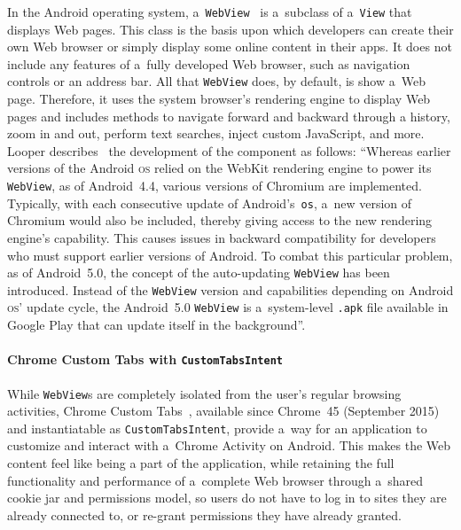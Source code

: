 \documentclass[sigconf,hyphens]{acmart}
\begin{document}
In the Android operating system, a~\texttt{WebView}~\cite{android2018webview}
is a~subclass of a~\texttt{View} that displays Web pages.
This class is the basis upon which developers can create their own Web browser
or simply display some online content in their apps.
It does not include any features of a~fully developed Web browser,
such as navigation controls or an address bar.
All that \texttt{WebView} does, by default, is show a~Web page.
Therefore, it uses the system browser's rendering engine to display Web pages
and includes methods to navigate forward and backward through a history,
zoom in and out, perform text searches, inject custom JavaScript, and more.
Looper describes~\cite{looper2015webviews}
the development of the component as follows:
``Whereas earlier versions of the Android \textsc{os}
relied on the WebKit rendering engine to power its \texttt{WebView},
as of Android~4.4, various versions of Chromium are implemented.
Typically, with each consecutive update of Android's~\texttt{os},
a~new version of Chromium would also be included, thereby giving access
to the new rendering engine's capability.
This causes issues in backward compatibility for developers
who must support earlier versions of Android.
To combat this particular problem, as of Android~5.0,
the concept of the auto-updating \texttt{WebView} has been introduced.
Instead of the \texttt{WebView} version and capabilities
depending on Android \textsc{os}' update cycle,
the Android~5.0 \texttt{WebView} is a~system-level \texttt{.apk} file
available in Google Play that can update itself in the background''.

\paragraph{Chrome Custom Tabs with \texttt{CustomTabsIntent}}

While \texttt{WebView}s are completely isolated from the user's regular browsing activities,
Chrome Custom Tabs~\cite{kinlan2016customtabs}, available since Chrome~45 (September 2015)
and instantiatable as \texttt{CustomTabsIntent}, provide a~way for an application
to customize and interact with a~Chrome Activity on Android.
This makes the Web content feel like being a part of the application,
while retaining the full functionality and performance of a~complete Web browser
through a~shared cookie jar and permissions model, so users do not have to log in
to sites they are already connected to, or re-grant permissions they have already granted.
\end{document}
